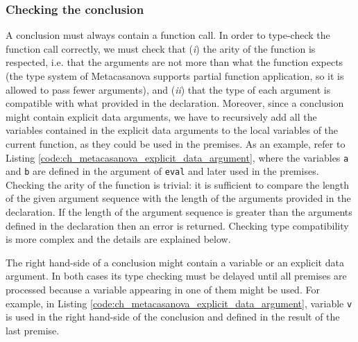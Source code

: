 \subsubsection{Checking the conclusion}
A conclusion must always contain a function call. In order to type-check the function call correctly, we must check that (\textit{i}) the arity of the function is respected, i.e. that the arguments are not more than what the function expects (the type system of Metacasanova supports partial function application, so it is allowed to pass fewer arguments), and (\textit{ii}) that the type of each argument is compatible with what provided in the declaration. Moreover, since a conclusion might contain explicit data arguments, we have to recursively add all the variables contained in the explicit data arguments to the local variables of the current function, as they could be used in the premises. As an example, refer to Listing \ref{code:ch_metacasanova_explicit_data_argument}, where the variables \texttt{a} and \texttt{b} are defined in the argument of \texttt{eval} and later used in the premises.
Checking the arity of the function is trivial: it is sufficient to compare the length of the given argument sequence with the length of the arguments provided in the declaration. If the length of the argument sequence is greater than the arguments defined in the declaration then an error is returned. Checking type compatibility is more complex and the details are explained below.

The right hand-side of a conclusion might contain a variable or an explicit data argument. In both cases its type checking must be delayed until all premises are processed because a variable appearing in one of them might be used. For example, in Listing \ref{code:ch_metacasanova_explicit_data_argument}, variable \texttt{v} is used in the right hand-side of the conclusion and defined in the result of the last premise.

